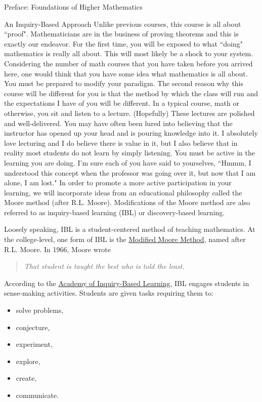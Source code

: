 \documentclass[11pt]{article}
\begin{document}
\begin{section}{Preface: Foundations of Higher Mathematics}
\begin{subsection}{An Inquiry-Based Approach}
Unlike previous courses, this course is all about ``proof". Mathematicians are in the business of proving theorems and this is exactly our endeavor. For the first time, you will be exposed to what ``doing" mathematics is really all about. This will most likely be a shock to your system. Considering the number of math courses that you have taken before you arrived here, one would think that you have some idea what mathematics is all about. You must be prepared to modify your paradigm. The second reason why this course will be different for you is that the method by which the class will run and the expectations I have of you will be different. In a typical course, math or otherwise, you sit and listen to a lecture. (Hopefully) These lectures are polished and well-delivered. You may have often been lured into believing that the instructor has opened up your head and is pouring knowledge into it. I absolutely love lecturing and I do believe there is value in it, but I also believe that in reality most students do not learn by simply listening. You must be active in the learning you are doing. I'm sure each of you have said to yourselves, ``Hmmm, I understood this concept when the professor was going over it, but now that I am alone, I am lost." In order to promote a more active participation in your learning, we will incorporate ideas from an educational philosophy called the Moore method (after R.L. Moore). Modifications of the Moore method are also referred to as inquiry-based learning (IBL) or discovery-based learning.

Loosely speaking, IBL is a student-centered method of teaching mathematics. At the college-level, one form of IBL is the \href{http://legacyrlmoore.org/method.html}{Modified Moore Method}, named after R.L. Moore.  In 1966, Moore wrote

\begin{quote}
\emph{That student is taught the best who is told the least.}
\end{quote}

According to the \href{http://www.inquirybasedlearning.org}{Academy of Inquiry-Based Learning}, IBL engages students in sense-making activities.  Students are given tasks requiring them to:
\begin{itemize}
\item solve problems,
\item conjecture,
\item experiment,
\item explore,
\item create,
\item communicate.
\end{itemize}


\end{subsection}
\end{section}
\end{document}
